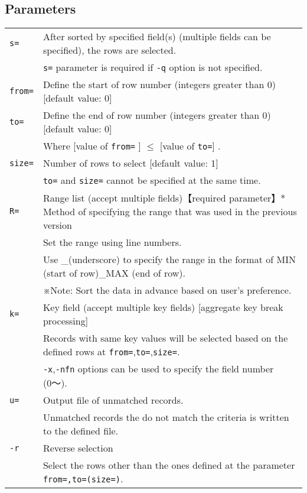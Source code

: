 \subsection*{Parameters}
\begin{table}[htbp]
{\small
\begin{tabular}{ll}
\verb|s=|    & After sorted by specified field(s) (multiple fields can be specified), the rows are selected.  \\
             & \verb|s=| parameter is required if \verb|-q| option is not specified. \\
\verb|from=| & Define the start of row number (integers greater than 0) [default value: 0] \\
\verb|to=|   & Define the end of row number (integers greater than 0) [default value: 0] \\
             & Where [value of \verb|from=| ] $\le$ [value of \verb|to=|] . \\
\verb|size=| & Number of rows to select [default value: 1]\\
             & \verb|to=| and \verb|size=| cannot be specified at the same time. \\
\verb|R=|    & Range list (accept multiple fields)【required parameter】* Method of specifying the range that was used in the previous version\\
             & Set the range using line numbers.\\
             & Use \_(underscore) to specify the range in the format of MIN (start of row)\_MAX (end of row).\\
             & ※Note: Sort the data in advance based on user's preference.  \\
\verb|k=|    & Key field (accept multiple key fields) [aggregate key break processing] \\
             & Records with same key values will be selected based on the defined rows at \verb|from=|,\verb|to=|,\verb|size=|. \\
		& \verb|-x|,\verb|-nfn| options can be used to specify the field number (0〜). \\
\verb|u=|    & Output file of unmatched records. \\
             & Unmatched records the do not match the criteria is written to the defined file.\\
\verb|-r|    & Reverse selection\\
             & Select the rows other than the ones defined at the parameter \verb|from=,to=(size=)|.\\
\end{tabular} 
}
\end{table} 


